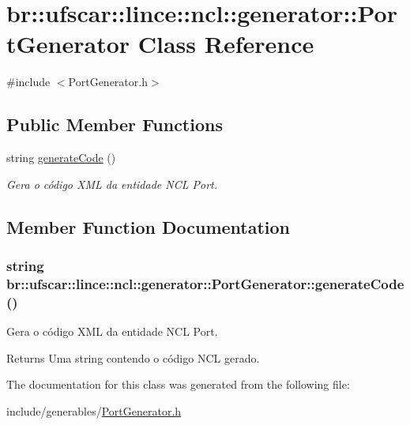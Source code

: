 \hypertarget{classbr_1_1ufscar_1_1lince_1_1ncl_1_1generator_1_1PortGenerator}{
\section{br::ufscar::lince::ncl::generator::PortGenerator Class Reference}
\label{classbr_1_1ufscar_1_1lince_1_1ncl_1_1generator_1_1PortGenerator}
}


{\ttfamily \#include $<$PortGenerator.h$>$}

\subsection*{Public Member Functions}
\begin{DoxyCompactItemize}
\item 
string \hyperlink{classbr_1_1ufscar_1_1lince_1_1ncl_1_1generator_1_1PortGenerator_ab47fa67529d29e9e409a2a313a08002b}{generateCode} ()
\begin{DoxyCompactList}\small\item\em Gera o código XML da entidade NCL Port. \item\end{DoxyCompactList}\end{DoxyCompactItemize}


\subsection{Member Function Documentation}
\hypertarget{classbr_1_1ufscar_1_1lince_1_1ncl_1_1generator_1_1PortGenerator_ab47fa67529d29e9e409a2a313a08002b}{
\subsubsection[{generateCode}]{\setlength{\rightskip}{0pt plus 5cm}string br::ufscar::lince::ncl::generator::PortGenerator::generateCode ()}}
\label{classbr_1_1ufscar_1_1lince_1_1ncl_1_1generator_1_1PortGenerator_ab47fa67529d29e9e409a2a313a08002b}


Gera o código XML da entidade NCL Port. 

\begin{DoxyReturn}{Returns}
Uma string contendo o código NCL gerado. 
\end{DoxyReturn}


The documentation for this class was generated from the following file:\begin{DoxyCompactItemize}
\item 
include/generables/\hyperlink{PortGenerator_8h}{PortGenerator.h}\end{DoxyCompactItemize}
